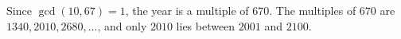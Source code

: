 Since $\gcd(10,67)=1$, the year is a multiple of $670$. The multiples of $670$ are $1340,2010,2680,\dots$, and only $\boxed{2010}$ lies between $2001$ and $2100$.
